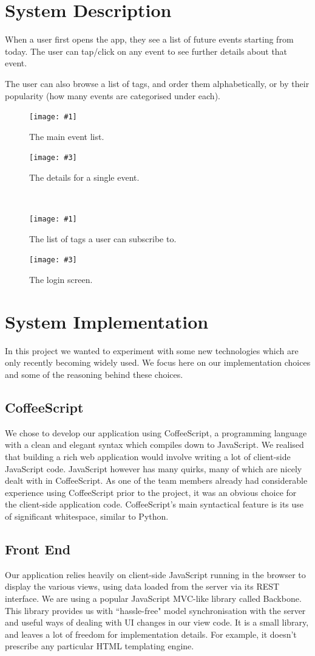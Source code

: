 \documentclass[11pt]{article}
\newcommand{\twofigure}[4]{
\begin{minipage}{0.45\textwidth}
    \centering
    \texttt{[image: \#1]}
    \caption{#2}
\end{minipage}
\begin{minipage}{0.45\textwidth}
    \centering
    \texttt{[image: \#3]}
    \caption{#4}
\end{minipage}
}
\begin{document}
\section {System Description}

When a user first opens the app, they see a list of future events starting from today. The user can tap/click on any event to see further details about that event.

The user can also browse a list of tags, and order them alphabetically, or by their popularity (how many events are categorised under each).


\begin{figure}
\twofigure{images/event-list.png}{The main event list.}{images/event-detail.png}{The details for a single event.}
\\[2em]
\twofigure{images/tag-list.png}{The list of tags a user can subscribe to.}{images/login.png}{The login screen.}
\end{figure}

\section {System Implementation}

In this project we wanted to experiment with some new technologies which are only recently becoming widely used. We focus here on our implementation choices and some of the reasoning behind these choices.

\subsection{CoffeeScript}
We chose to develop our application using CoffeeScript, a programming language with a clean and elegant syntax which compiles down to JavaScript. We realised that building a rich web application would involve writing a lot of client-side JavaScript code. JavaScript however has many quirks, many of which are nicely dealt with in CoffeeScript. As one of the team members already had considerable experience using CoffeeScript prior to the project, it was an obvious choice for the client-side application code. CoffeeScript's main syntactical feature is its use of significant whitespace, similar to Python.

\subsection {Front End}

Our application relies heavily on client-side JavaScript running in the browser to display the various views, using data loaded from the server via its REST interface.
We are using a popular JavaScript MVC-like library called Backbone. This library provides us with ``hassle-free" model synchronisation with the server and useful ways of dealing with UI changes in our view code. It is a small library, and leaves a lot of freedom for implementation details. For example, it doesn't prescribe any particular HTML templating engine.
\end{document}

